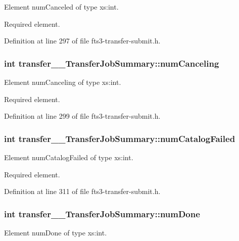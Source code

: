Element numCanceled of type xs:int. 

Required element. 

Definition at line 297 of file fts3-\/transfer-\/submit.h.

\subsubsection[{numCanceling}]{\setlength{\rightskip}{0pt plus 5cm}int {\bf transfer\_\-\_\-TransferJobSummary::numCanceling}}\label{classtransfer____TransferJobSummary_ae95e634dad337feb60311f67bf072160}


Element numCanceling of type xs:int. 

Required element. 

Definition at line 299 of file fts3-\/transfer-\/submit.h.

\subsubsection[{numCatalogFailed}]{\setlength{\rightskip}{0pt plus 5cm}int {\bf transfer\_\-\_\-TransferJobSummary::numCatalogFailed}}\label{classtransfer____TransferJobSummary_ae9fd48b3db1b975868c370df4015adef}


Element numCatalogFailed of type xs:int. 

Required element. 

Definition at line 311 of file fts3-\/transfer-\/submit.h.

\subsubsection[{numDone}]{\setlength{\rightskip}{0pt plus 5cm}int {\bf transfer\_\-\_\-TransferJobSummary::numDone}}\label{classtransfer____TransferJobSummary_af4ce403c9dd716b34b33fa048038317a}


Element numDone of type xs:int. 

